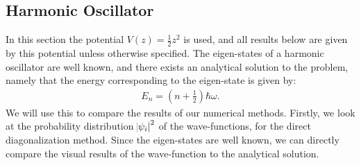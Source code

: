\documentclass[a4paper]{article}
\newcommand{\w}{\omega}
\begin{document}
\subsection{Harmonic Oscillator}
In this section the potential $V(z) = \frac{1}{2}z^2$ is used, and all results below are given by this potential unless otherwise specified.
The eigen-states of a harmonic oscillator are well known, and there exists an analytical solution to the problem, namely that the energy corresponding to the eigen-state is given by:
\begin{align*}
    E_n = \left(n + \frac{1}{2}\right)\hbar\w.
\end{align*}We will use this to compare the results of our numerical methods. Firstly, we look at the probability distribution $\abs{\psi_i}^2$ of the wave-functions, for the direct diagonalization method.
Since the eigen-states are well known, we can directly compare the visual results of the wave-function to the analytical solution.
\end{document}
